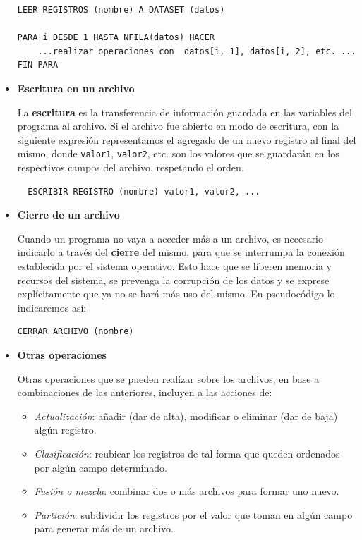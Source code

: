 \documentclass[
]{book}
\providecommand{\tightlist}{%
  \setlength{\itemsep}{0pt}\setlength{\parskip}{0pt}}
\begin{document}
\begin{itemize}
\begin{verbatim}
LEER REGISTROS (nombre) A DATASET (datos)

PARA i DESDE 1 HASTA NFILA(datos) HACER
    ...realizar operaciones con  datos[i, 1], datos[i, 2], etc. ...
FIN PARA
\end{verbatim}
\item
  \textbf{Escritura en un archivo}

  La \textbf{escritura} es la transferencia de información guardada en las variables del programa al archivo. Si el archivo fue abierto en modo de escritura, con la siguiente expresión representamos el agregado de un nuevo registro al final del mismo, donde \texttt{valor1}, \texttt{valor2}, etc. son los valores que se guardarán en los respectivos campos del archivo, respetando el orden.

\begin{verbatim}
  ESCRIBIR REGISTRO (nombre) valor1, valor2, ...
\end{verbatim}
\item
  \textbf{Cierre de un archivo}

  Cuando un programa no vaya a acceder más a un archivo, es necesario indicarlo a través del \textbf{cierre} del mismo, para que se interrumpa la conexión establecida por el sistema operativo. Esto hace que se liberen memoria y recursos del sistema, se prevenga la corrupción de los datos y se exprese explícitamente que ya no se hará más uso del mismo. En pseudocódigo lo indicaremos así:

\begin{verbatim}
CERRAR ARCHIVO (nombre)
\end{verbatim}
\item
  \textbf{Otras operaciones}

  Otras operaciones que se pueden realizar sobre los archivos, en base a combinaciones de las anteriores, incluyen a las acciones de:

  \begin{itemize}
  \tightlist
  \item
    \emph{Actualización}: añadir (dar de alta), modificar o eliminar (dar de baja) algún registro.
  \item
    \emph{Clasificación}: reubicar los registros de tal forma que queden ordenados por algún campo determinado.
  \item
    \emph{Fusión o mezcla}: combinar dos o más archivos para formar uno nuevo.
  \item
    \emph{Partición}: subdividir los registros por el valor que toman en algún campo para generar más de un archivo.
  \end{itemize}
\end{itemize}
\end{document}
